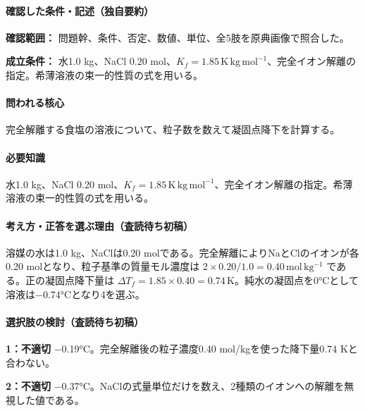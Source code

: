 \paragraph{確認した条件・記述（独自要約）}\mbox{}\par

\noindent\textbf{確認範囲：} 問題幹、条件、否定、数値、単位、全5肢を原典画像で照合した。\par

\noindent\textbf{成立条件：} 水1.0 kg、NaCl 0.20 mol、\(K_f=1.85\,\mathrm{K\,kg\,mol^{-1}}\)、完全イオン解離の指定。希薄溶液の束一的性質の式を用いる。\par

\paragraph{問われる核心} 完全解離する食塩の溶液について、粒子数を数えて凝固点降下を計算する。

\paragraph{必要知識} 水1.0 kg、NaCl 0.20 mol、\(K_f=1.85\,\mathrm{K\,kg\,mol^{-1}}\)、完全イオン解離の指定。希薄溶液の束一的性質の式を用いる。

\paragraph{考え方・正答を選ぶ理由（査読待ち初稿）} 溶媒の水は1.0 kg、NaClは0.20 molである。完全解離によりNaとClのイオンが各0.20 molとなり、粒子基準の質量モル濃度は \(2\times0.20/1.0=0.40\,\mathrm{mol\,kg^{-1}}\) である。正の凝固点降下量は \(\Delta T_f=1.85\times0.40=0.74\,\mathrm K\)。純水の凝固点を0°Cとして溶液は−0.74°Cとなり4を選ぶ。

\paragraph{選択肢の検討（査読待ち初稿）}\mbox{}\par

\noindent\textbf{1：不適切} −0.19°C。完全解離後の粒子濃度0.40 mol/kgを使った降下量0.74 Kと合わない。\par

\noindent\textbf{2：不適切} −0.37°C。NaClの式量単位だけを数え、2種類のイオンへの解離を無視した値である。\par

